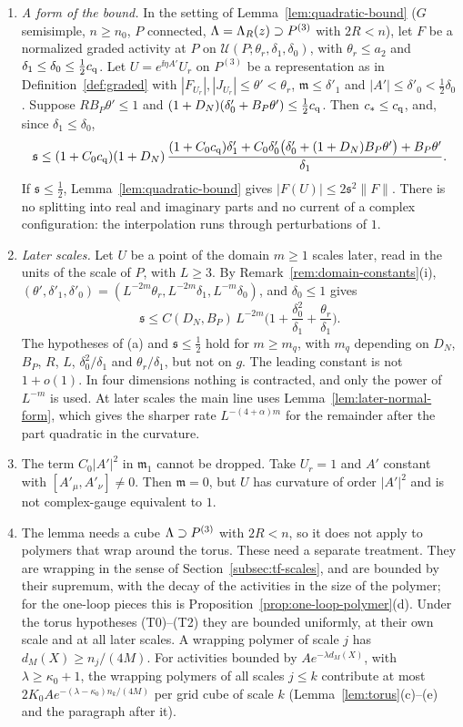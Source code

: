 \begin{remark}\label{rem:later-scales}
\begin{enumerate}[label=(\alph*)]
\item \emph{A form of the bound.} In the setting of Lemma~\ref{lem:quadratic-bound} ($G$ semisimple, $n\ge n_0$, $P$ connected, $\Lambda=\Lambda_R(z)\supset P^{(3)}$ with $2R<n$), let $F$ be a normalized graded activity at $P$ on $\mathcal U(P;\theta_r,\delta_1,\delta_0)$, with $\theta_r\le a_2$ and $\delta_1\le\delta_0\le\frac12c_{\rm q}$. Let $U=e^{\ii\eta A'}U_r$ on $P^{(3)}$ be a representation as in Definition~\ref{def:graded} with $|F_{U_r}|,|J_{U_r}|\le\theta'<\theta_r$, $\mathfrak m\le\delta'_1$ and $|A'|\le\delta'_0<\frac12\delta_0$. Suppose $RB_P\theta'\le1$ and $(1+D_N)(\delta'_0+B_P\theta')\le\frac12c_{\rm q}$. Then $c_*\le c_{\rm q}$, and, since $\delta_1\le\delta_0$,
\[
\mathfrak s\le(1+C_0c_{\rm q})(1+D_N)\,\frac{(1+C_0c_{\rm q})\delta'_1+C_0\delta'_0\big(\delta'_0+(1+D_N)B_P\theta'\big)+B_P\theta'}{\delta_1}.
\]
If $\mathfrak s\le\frac12$, Lemma~\ref{lem:quadratic-bound} gives $|F(U)|\le2\mathfrak s^2\|F\|$. There is no splitting into real and imaginary parts and no current of a complex configuration: the interpolation runs through perturbations of $1$.
\item \emph{Later scales.} Let $U$ be a point of the domain $m\ge1$ scales later, read in the units of the scale of $P$, with $L\ge3$. By Remark~\ref{rem:domain-constants}(i), $(\theta',\delta'_1,\delta'_0)=(L^{-2m}\theta_r,L^{-2m}\delta_1,L^{-m}\delta_0)$, and $\delta_0\le1$ gives
\[
\mathfrak s\le C(D_N,B_P)\,L^{-2m}\Big(1+\frac{\delta_0^2}{\delta_1}+\frac{\theta_r}{\delta_1}\Big).
\]
The hypotheses of (a) and $\mathfrak s\le\frac12$ hold for $m\ge m_q$, with $m_q$ depending on $D_N$, $B_P$, $R$, $L$, $\delta_0^2/\delta_1$ and $\theta_r/\delta_1$, but not on $g$. The leading constant is not $1+o(1)$. In four dimensions nothing is contracted, and only the power of $L^{-m}$ is used. At later scales the main line uses Lemma~\ref{lem:later-normal-form}, which gives the sharper rate $L^{-(4+\alpha)m}$ for the remainder after the part quadratic in the curvature.
\item The term $C_0|A'|^2$ in $\mathfrak m_1$ cannot be dropped. Take $U_r=1$ and $A'$ constant with $[A'_\mu,A'_\nu]\ne0$. Then $\mathfrak m=0$, but $U$ has curvature of order $|A'|^2$ and is not complex-gauge equivalent to $1$.
\item The lemma needs a cube $\Lambda\supset P^{(3)}$ with $2R<n$, so it does not apply to polymers that wrap around the torus. These need a separate treatment. They are wrapping in the sense of Section~\ref{subsec:tf-scales}, and are bounded by their supremum, with the decay of the activities in the size of the polymer; for the one-loop pieces this is Proposition~\ref{prop:one-loop-polymer}(d). Under the torus hypotheses (T0)--(T2) they are bounded uniformly, at their own scale and at all later scales. A wrapping polymer of scale $j$ has $d_M(X)\ge n_j/(4M)$. For activities bounded by $Ae^{-\lambda d_M(X)}$, with $\lambda\ge\kappa_0+1$, the wrapping polymers of all scales $j\le k$ contribute at most $2K_0Ae^{-(\lambda-\kappa_0)n_k/(4M)}$ per grid cube of scale $k$ (Lemma~\ref{lem:torus}(c)--(e) and the paragraph after it).

\end{enumerate}
\end{remark}
